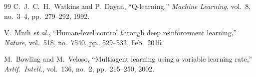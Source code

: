 \documentclass[journal,twocolumn]{IEEEtran}
\begin{document}
\begin{thebibliography}{99}
C.~J.~C.~H.~Watkins and P.~Dayan,
``Q-learning,''
\emph{Machine Learning}, vol.~8, no.~3--4, pp.~279--292, 1992.

V.~Mnih \emph{et al.},
``Human-level control through deep reinforcement learning,''
\emph{Nature}, vol.~518, no.~7540, pp.~529--533, Feb.\ 2015.

M.~Bowling and M.~Veloso,
``Multiagent learning using a variable learning rate,''
\emph{Artif.\ Intell.}, vol.~136, no.~2, pp.~215--250, 2002.

\end{thebibliography}

\balance
\end{document}
